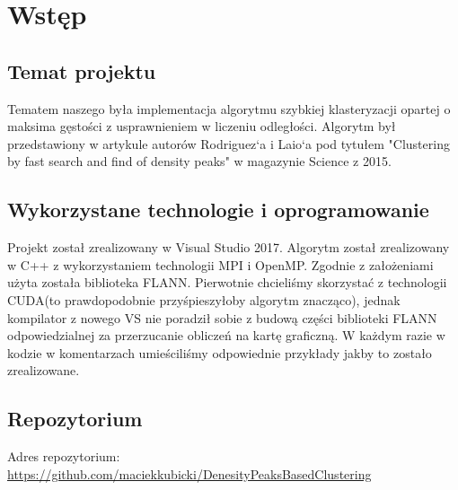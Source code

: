 \documentclass[a4paper,10pt,table]{article}
\begin{document}
\section{Wstęp}
\subsection{Temat projektu}
Tematem naszego była implementacja algorytmu szybkiej klasteryzacji opartej o maksima gęstości z usprawnieniem w liczeniu odległości. Algorytm był przedstawiony w artykule autorów Rodriguez`a i	Laio`a pod tytułem	"Clustering	by	 fast	search	and	 find	of	density	peaks" w magazynie Science z	2015.
\subsection{Wykorzystane technologie i oprogramowanie}
Projekt został zrealizowany w Visual Studio 2017. Algorytm został zrealizowany w C++ z wykorzystaniem technologii MPI i OpenMP. Zgodnie z założeniami użyta została biblioteka FLANN. Pierwotnie chcieliśmy skorzystać z technologii CUDA(to prawdopodobnie przyśpieszyłoby algorytm znacząco), jednak kompilator z nowego VS nie poradził sobie z budową części biblioteki FLANN odpowiedzialnej za przerzucanie obliczeń na kartę graficzną. W każdym razie w kodzie w komentarzach umieściliśmy odpowiednie przykłady jakby to zostało zrealizowane.
\subsection{Repozytorium}
Adres repozytorium:\newline
\url{https://github.com/maciekkubicki/DenesityPeaksBasedClustering}

\newpage
\end{document}

